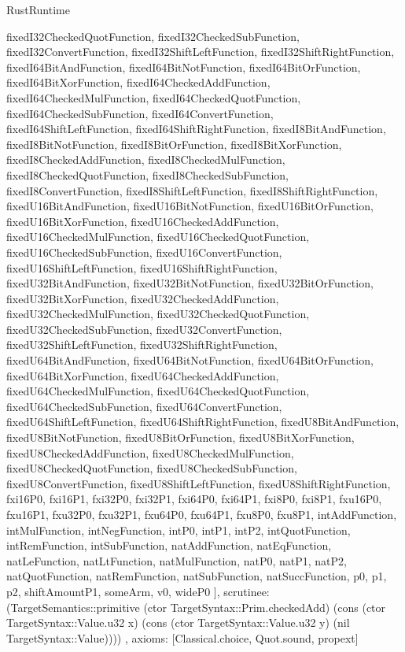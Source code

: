 \begin{lexlean}{RustRuntime}
\begin{semanticmodule}
{{      fixedI32CheckedQuotFunction,
      fixedI32CheckedSubFunction,
      fixedI32ConvertFunction,
      fixedI32ShiftLeftFunction,
      fixedI32ShiftRightFunction,
      fixedI64BitAndFunction,
      fixedI64BitNotFunction,
      fixedI64BitOrFunction,
      fixedI64BitXorFunction,
      fixedI64CheckedAddFunction,
      fixedI64CheckedMulFunction,
      fixedI64CheckedQuotFunction,
      fixedI64CheckedSubFunction,
      fixedI64ConvertFunction,
      fixedI64ShiftLeftFunction,
      fixedI64ShiftRightFunction,
      fixedI8BitAndFunction,
      fixedI8BitNotFunction,
      fixedI8BitOrFunction,
      fixedI8BitXorFunction,
      fixedI8CheckedAddFunction,
      fixedI8CheckedMulFunction,
      fixedI8CheckedQuotFunction,
      fixedI8CheckedSubFunction,
      fixedI8ConvertFunction,
      fixedI8ShiftLeftFunction,
      fixedI8ShiftRightFunction,
      fixedU16BitAndFunction,
      fixedU16BitNotFunction,
      fixedU16BitOrFunction,
      fixedU16BitXorFunction,
      fixedU16CheckedAddFunction,
      fixedU16CheckedMulFunction,
      fixedU16CheckedQuotFunction,
      fixedU16CheckedSubFunction,
      fixedU16ConvertFunction,
      fixedU16ShiftLeftFunction,
      fixedU16ShiftRightFunction,
      fixedU32BitAndFunction,
      fixedU32BitNotFunction,
      fixedU32BitOrFunction,
      fixedU32BitXorFunction,
      fixedU32CheckedAddFunction,
      fixedU32CheckedMulFunction,
      fixedU32CheckedQuotFunction,
      fixedU32CheckedSubFunction,
      fixedU32ConvertFunction,
      fixedU32ShiftLeftFunction,
      fixedU32ShiftRightFunction,
      fixedU64BitAndFunction,
      fixedU64BitNotFunction,
      fixedU64BitOrFunction,
      fixedU64BitXorFunction,
      fixedU64CheckedAddFunction,
      fixedU64CheckedMulFunction,
      fixedU64CheckedQuotFunction,
      fixedU64CheckedSubFunction,
      fixedU64ConvertFunction,
      fixedU64ShiftLeftFunction,
      fixedU64ShiftRightFunction,
      fixedU8BitAndFunction,
      fixedU8BitNotFunction,
      fixedU8BitOrFunction,
      fixedU8BitXorFunction,
      fixedU8CheckedAddFunction,
      fixedU8CheckedMulFunction,
      fixedU8CheckedQuotFunction,
      fixedU8CheckedSubFunction,
      fixedU8ConvertFunction,
      fixedU8ShiftLeftFunction,
      fixedU8ShiftRightFunction,
      fxi16P0,
      fxi16P1,
      fxi32P0,
      fxi32P1,
      fxi64P0,
      fxi64P1,
      fxi8P0,
      fxi8P1,
      fxu16P0,
      fxu16P1,
      fxu32P0,
      fxu32P1,
      fxu64P0,
      fxu64P1,
      fxu8P0,
      fxu8P1,
      intAddFunction,
      intMulFunction,
      intNegFunction,
      intP0,
      intP1,
      intP2,
      intQuotFunction,
      intRemFunction,
      intSubFunction,
      natAddFunction,
      natEqFunction,
      natLeFunction,
      natLtFunction,
      natMulFunction,
      natP0,
      natP1,
      natP2,
      natQuotFunction,
      natRemFunction,
      natSubFunction,
      natSuccFunction,
      p0,
      p1,
      p2,
      shiftAmountP1,
      someArm,
      v0,
      wideP0
    ],
    scrutinee: (TargetSemantics::primitive (ctor TargetSyntax::Prim.checkedAdd) (cons (ctor TargetSyntax::Value.u32 x) (cons (ctor TargetSyntax::Value.u32 y) (nil TargetSyntax::Value))))
  },
  axioms: [Classical.choice, Quot.sound, propext]
}


\end{semanticmodule}
\end{lexlean}
